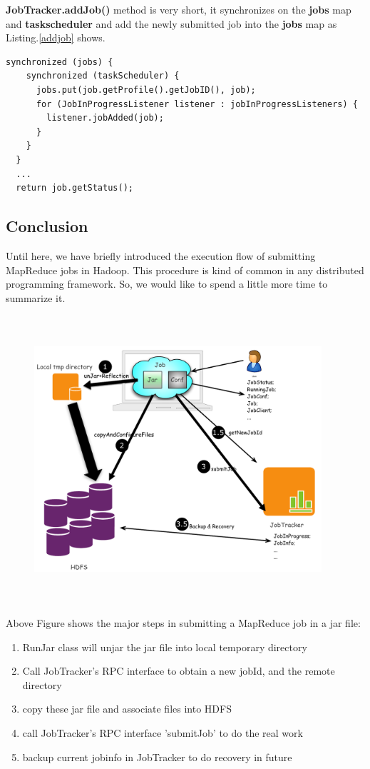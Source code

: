 \documentclass{tufte-book}
\begin{document}
\textbf{JobTracker.addJob()} method is very short, it synchronizes on
the \textbf{jobs} map and \textbf{taskscheduler} and add the newly
submitted job into the \textbf{jobs} map as Listing.\ref{addjob} shows.
\begin{lstlisting}[caption=addJob of JobTracker, label=addjob]
  synchronized (jobs) {
    synchronized (taskScheduler) {
      jobs.put(job.getProfile().getJobID(), job);
      for (JobInProgressListener listener : jobInProgressListeners) {
        listener.jobAdded(job);
      }
    }
  }
  ...
  return job.getStatus();
\end{lstlisting}

\subsection{Conclusion}
Until here, we have briefly introduced the execution flow of
submitting MapReduce jobs in Hadoop. This procedure is kind of common
in any distributed programming framework. So, we would like to
spend a little more time to summarize it.

\begin{figure}
\centering
\includegraphics[height=4.2in, width=4.2in]{graphics/HadoopJobSubmit.pdf}
\label{mrj}
\end{figure}

Above Figure shows the major steps in submitting a MapReduce job in a
jar file:
\begin{enumerate}
\item RunJar class will unjar the jar file into local temporary
  directory
\item Call JobTracker's RPC interface to obtain a new jobId, and the
  remote directory
\item copy these jar file and associate files into HDFS
\item call JobTracker's RPC interface 'submitJob' to do the real work
\item backup current jobinfo in JobTracker to do recovery in future
\end{enumerate}





\printindex
\end{document}
